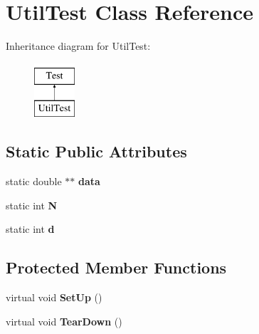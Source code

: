 \hypertarget{classUtilTest}{\section{Util\+Test Class Reference}
\label{classUtilTest}
}
Inheritance diagram for Util\+Test\+:\begin{figure}[H]
\begin{center}
\leavevmode
\includegraphics[height=2.000000cm]{classUtilTest}
\end{center}
\end{figure}
\subsection*{Static Public Attributes}
\begin{DoxyCompactItemize}
\item 
\hypertarget{classUtilTest_a13e27888113d6f5f4179c8dd88a39319}{static double $\ast$$\ast$ {\bfseries data}}\label{classUtilTest_a13e27888113d6f5f4179c8dd88a39319}

\item 
\hypertarget{classUtilTest_af0f842c0c1dcc77b49a38a00729bb1b5}{static int {\bfseries N}}\label{classUtilTest_af0f842c0c1dcc77b49a38a00729bb1b5}

\item 
\hypertarget{classUtilTest_a362326a74eb03fd9e035581901c6e103}{static int {\bfseries d}}\label{classUtilTest_a362326a74eb03fd9e035581901c6e103}

\end{DoxyCompactItemize}
\subsection*{Protected Member Functions}
\begin{DoxyCompactItemize}
\item 
\hypertarget{classUtilTest_a8f67bdc9dd37ff9fd862f66ddfb863cb}{virtual void {\bfseries Set\+Up} ()}\label{classUtilTest_a8f67bdc9dd37ff9fd862f66ddfb863cb}

\item 
\hypertarget{classUtilTest_a38fecea095d1c8f8bd55c86292425081}{virtual void {\bfseries Tear\+Down} ()}\label{classUtilTest_a38fecea095d1c8f8bd55c86292425081}

\end{DoxyCompactItemize}
